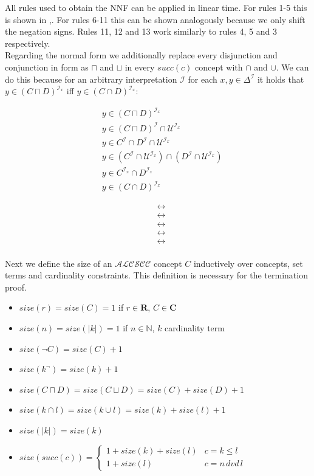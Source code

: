 \documentclass{book}
\theoremstyle{break}
\theoremstyle{definition}
\begin{document}
All rules used to obtain the NNF can be applied in linear time. For rules 1-5 this is shown in \cite{1},\cite{6}. For rules 6-11 this can be shown analogously because we only shift the negation signs. Rules 11, 12 and 13 work similarly to rules 4, 5 and 3 respectively.\\
Regarding the normal form we additionally replace every disjunction and conjunction in form as $\sqcap$ and $\sqcup$ in every $succ(c)$ concept with $\cap$ and $\cup$. We can do this because for an arbitrary interpretation $\mathcal{I}$ for each $x,y\in\Delta^\mathcal{I}$ it holds that $y\in (C\sqcap D)^{\mathcal{I}_x}$ iff $y\in(C\cap D)^{\mathcal{I}_x}$:
\begin{figure}[H]
\begin{minipage}[t]{0.8\textwidth}
\begin{align*}
&y\in (C\sqcap D)^{\mathcal{I}_x}\\
&y\in (C\sqcap D)^\mathcal{I}\cap\mathcal{U}^{\mathcal{I}_x}\\
&y\in C^\mathcal{I}\cap D^\mathcal{I}\cap \mathcal{U}^{\mathcal{I}_x}\\
&y\in (C^\mathcal{I}\cap\mathcal{U}^{\mathcal{I}_x})\cap (D^\mathcal{I}\cap\mathcal{U}^{\mathcal{I}_x})\\
&y\in C^{\mathcal{I}_x}\cap D^{\mathcal{I}_x}\\\
&y\in (C\cap D)^{\mathcal{I}_x}
\end{align*}
\end{minipage}%
\begin{minipage}[t]{0.2\textwidth}
\begin{align*}
&\leftrightarrow\\
&\leftrightarrow\\
&\leftrightarrow\\
&\leftrightarrow\\
&\leftrightarrow\\
\end{align*}
\end{minipage}
\end{figure}
Next we define the size of an $\mathcal{ALCSCC}$ concept $C$ inductively over concepts, set terms and cardinality constraints. This definition is necessary for the termination proof.
\begin{itemize}
\item $size(r)=size(C)=1$ if $r\in\mathbf{R}$, $C\in\mathbf{C}$
\item $size(n)=size(|k|)=1$ if $n\in\mathbb{N}$, $k$ cardinality term
\item $size(\neg C)=size(C)+1$
\item $size(k^\neg)=size(k)+1$
\item $size(C\sqcap D)=size(C\sqcup D)= size(C)+ size(D)+1$
\item $size(k\cap l)=size(k\cup l)= size(k)+ size(l)+1$
\item $size(|k|)=size(k)$
\item $size(succ(c))=\begin{cases}
1+size(k)+size(l) & c=k\leq l \\
1+size(l)& c= n\,dvd\,l
\end{cases}$
\end{itemize}
\end{document}
